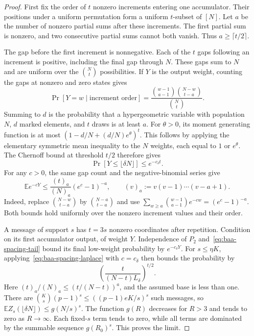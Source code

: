 \begin{proof}
First fix the order of $t$ nonzero increments entering one accumulator.
Their positions under a uniform permutation form a uniform $t$-subset
of $[N]$. Let $a$ be the number of nonzero partial sums after these
increments. The first partial sum is nonzero, and two consecutive partial
sums cannot both vanish. Thus $a\ge\lceil t/2\rceil$.

The gap before the first increment is nonnegative. Each of the $t$ gaps
following an increment is positive, including the final gap through $N$.
These gaps sum to $N$ and are uniform over the $\binom Nt$ possibilities.
If $Y$ is the output weight, counting the gaps at nonzero and zero states gives
\[
 \Pr[Y=w\mid\text{increment order}]
 =\frac{\binom{w-1}{a-1}\binom{N-w}{t-a}}{\binom Nt}.
\]
Summing to $d$ is the probability that a hypergeometric variable with
population $N$, $d$ marked elements, and $t$ draws is at least $a$.
For $\theta>0$, its moment generating function is at most
$(1-d/N+(d/N)e^\theta)^t$. This follows by applying the elementary
symmetric mean inequality to the $N$ weights, each equal to $1$ or
$e^\theta$. The Chernoff bound at threshold $t/2$ therefore gives
\begin{equation}\label{eq:baa-spacing-tail}
 \Pr[Y\le\lfloor\delta N\rfloor]\le e^{-c_\delta t}.
\end{equation}
For any $c>0$, the same gap count and the negative-binomial series give
\begin{equation}\label{eq:baa-spacing-laplace}
 \mathbb E e^{-cY}
 \le \frac{(t)_a}{(N)_a}(e^c-1)^{-a},
 \qquad (v)_a:=v(v-1)\cdots(v-a+1).
\end{equation}
Indeed, replace $\binom{N-w}{t-a}$ by $\binom{N-a}{t-a}$ and use
$\sum_{w\ge a}\binom{w-1}{a-1}e^{-cw}=(e^c-1)^{-a}$.
Both bounds hold uniformly over the nonzero increment values and their order.

A message of support $s$ has $t=3s$ nonzero coordinates after repetition.
Condition on its first accumulator output, of weight $Y$.
Independence of $P_2$ and~\eqref{eq:baa-spacing-tail} bound its final
low-weight probability by $e^{-c_\delta Y}$. For $s\le\eta K$,
applying~\eqref{eq:baa-spacing-laplace} with $c=c_\delta$ then bounds the
probability by
\[
 \left(\frac{t}{(N-t)L_\delta}\right)^{t/2}.
\]
Here $(t)_a/(N)_a\le(t/(N-t))^a$, and the assumed base is less than one.
There are $\binom Ks(p-1)^s\le((p-1)eK/s)^s$ such messages, so
$\mathbb E Z_s(\lfloor\delta N\rfloor)\le g(N/s)^s$.
The function $g(R)$ decreases for $R>3$ and tends to zero as
$R\to\infty$. Each fixed-$s$ term tends to zero, while all terms are
dominated by the summable sequence $g(R_0)^s$. This proves the limit.
\end{proof}

